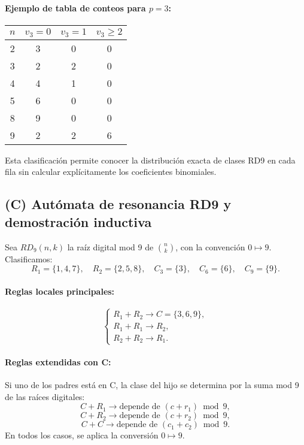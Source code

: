 \documentclass[12pt]{article}
\begin{document}
\paragraph{Ejemplo de tabla de conteos para $p=3$:}

\begin{center}
\begin{tabular}{c|c|c|c}
$n$ & $v_3=0$ & $v_3=1$ & $v_3 \ge 2$ \\
\hline
2 & 3 & 0 & 0 \\
3 & 2 & 2 & 0 \\
4 & 4 & 1 & 0 \\
5 & 6 & 0 & 0 \\
8 & 9 & 0 & 0 \\
9 & 2 & 2 & 6 \\
\end{tabular}
\end{center}


Esta clasificación permite conocer la distribución exacta de clases RD9 en cada fila sin calcular explícitamente los coeficientes binomiales.

\subsection*{(C) Autómata de resonancia RD9 y demostración inductiva}

Sea $RD_9(n,k)$ la raíz digital mod 9 de $\binom{n}{k}$, con la convención $0 \mapsto 9$.  
Clasificamos:
\[
R_1 = \{1,4,7\}, \quad R_2 = \{2,5,8\}, \quad C_3 = \{3\}, \quad C_6 = \{6\}, \quad C_9 = \{9\}.
\]

\paragraph{Reglas locales principales:}
\[
\begin{cases}
R_1 + R_2 \to C = \{3,6,9\}, \\
R_1 + R_1 \to R_2, \\
R_2 + R_2 \to R_1.
\end{cases}
\]

\paragraph{Reglas extendidas con C:}  
Si uno de los padres está en C, la clase del hijo se determina por la suma mod 9 de las raíces digitales:
\[
C + R_1 \to \text{depende de } (c + r_1) \bmod 9,
\]
\[
C + R_2 \to \text{depende de } (c + r_2) \bmod 9,
\]
\[
C + C \to \text{depende de } (c_1 + c_2) \bmod 9.
\]
En todos los casos, se aplica la conversión $0 \mapsto 9$.
\end{document}

